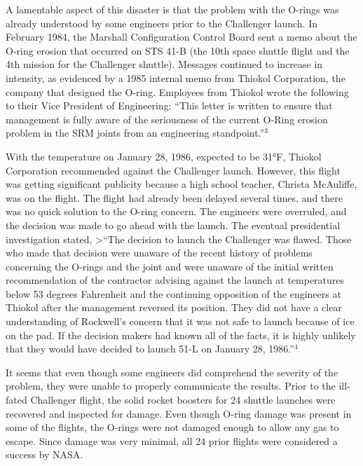 \documentclass[
]{report}
\begin{document}
A lamentable aspect of this disaster is that the problem with the O-rings was already understood by
some engineers prior to the Challenger launch. In February 1984, the Marshall Configuration Control
Board sent a memo about the O-ring erosion that occurred on STS 41-B (the 10th space shuttle flight and
the 4th mission for the Challenger shuttle). Messages continued to increase in intensity, as evidenced by
a 1985 internal memo from Thiokol Corporation, the company that designed the O-ring. Employees from
Thiokol wrote the following to their Vice President of Engineering: ``This letter is written to ensure that
management is fully aware of the seriousness of the current O-Ring erosion problem in the SRM joints
from an engineering standpoint.''\(^3\)

With the temperature on January 28, 1986, expected to be 31°F, Thiokol Corporation recommended
against the Challenger launch. However, this flight was getting significant publicity because a high school
teacher, Christa McAuliffe, was on the flight. The flight had already been delayed several times, and there
was no quick solution to the O-ring concern. The engineers were overruled, and the decision was made to go
ahead with the launch. The eventual presidential investigation stated,
\textgreater{}``The decision to launch the Challenger was flawed. Those who made that decision were unaware of
the recent history of problems concerning the O-rings and the joint and were unaware of the initial
written recommendation of the contractor advising against the launch at temperatures below 53
degrees Fahrenheit and the continuing opposition of the engineers at Thiokol after the management
reversed its position. They did not have a clear understanding of Rockwell's concern that it was not
safe to launch because of ice on the pad. If the decision makers had known all of the facts, it is highly
unlikely that they would have decided to launch 51-L on January 28, 1986.''\(^4\)

It seems that even though some engineers did comprehend the severity of the problem, they were unable
to properly communicate the results. Prior to the ill-fated Challenger flight, the solid rocket boosters for 24
shuttle launches were recovered and inspected for damage. Even though O-ring damage was present in some
of the flights, the O-rings were not damaged enough to allow any gas to escape. Since damage was very
minimal, all 24 prior flights were considered a success by NASA.
\end{document}
